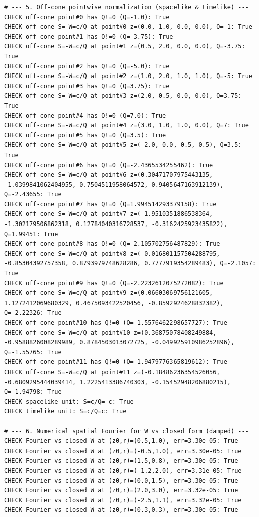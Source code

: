 \documentclass{article}
\theoremstyle{remark}
\begin{document}
\begin{lstlisting}
# --- 5. Off-cone pointwise normalization (spacelike & timelike) ---
CHECK off-cone point#0 has Q!=0 (Q=-1.0): True
CHECK off-cone S=-W=c/Q at point#0 z=(0.0, 1.0, 0.0, 0.0), Q=-1: True
CHECK off-cone point#1 has Q!=0 (Q=-3.75): True
CHECK off-cone S=-W=c/Q at point#1 z=(0.5, 2.0, 0.0, 0.0), Q=-3.75: True
CHECK off-cone point#2 has Q!=0 (Q=-5.0): True
CHECK off-cone S=-W=c/Q at point#2 z=(1.0, 2.0, 1.0, 1.0), Q=-5: True
CHECK off-cone point#3 has Q!=0 (Q=3.75): True
CHECK off-cone S=-W=c/Q at point#3 z=(2.0, 0.5, 0.0, 0.0), Q=3.75: True
CHECK off-cone point#4 has Q!=0 (Q=7.0): True
CHECK off-cone S=-W=c/Q at point#4 z=(3.0, 1.0, 1.0, 0.0), Q=7: True
CHECK off-cone point#5 has Q!=0 (Q=3.5): True
CHECK off-cone S=-W=c/Q at point#5 z=(-2.0, 0.0, 0.5, 0.5), Q=3.5: True
CHECK off-cone point#6 has Q!=0 (Q=-2.4365534255462): True
CHECK off-cone S=-W=c/Q at point#6 z=(0.30471707975443135, -1.0399841062404955, 0.7504511958064572, 0.9405647163912139), Q=-2.43655: True
CHECK off-cone point#7 has Q!=0 (Q=1.994514293379158): True
CHECK off-cone S=-W=c/Q at point#7 z=(-1.9510351886538364, -1.302179506862318, 0.12784040316728537, -0.3162425923435822), Q=1.99451: True
CHECK off-cone point#8 has Q!=0 (Q=-2.105702756487829): True
CHECK off-cone S=-W=c/Q at point#8 z=(-0.016801157504288795, -0.85304392757358, 0.8793979748628286, 0.7777919354289483), Q=-2.1057: True
CHECK off-cone point#9 has Q!=0 (Q=-2.2232612075272082): True
CHECK off-cone S=-W=c/Q at point#9 z=(0.06603069756121605, 1.1272412069680329, 0.4675093422520456, -0.8592924628832382), Q=-2.22326: True
CHECK off-cone point#10 has Q!=0 (Q=-1.5576462298657727): True
CHECK off-cone S=-W=c/Q at point#10 z=(0.36875078408249884, -0.9588826008289989, 0.8784503013072725, -0.049925910986252896), Q=-1.55765: True
CHECK off-cone point#11 has Q!=0 (Q=-1.9479776365819612): True
CHECK off-cone S=-W=c/Q at point#11 z=(-0.18486236354526056, -0.6809295444039414, 1.2225413386740303, -0.15452948206880215), Q=-1.94798: True
CHECK spacelike unit: S=c/Q=-c: True
CHECK timelike unit: S=c/Q=c: True

# --- 6. Numerical spatial Fourier for W vs closed form (damped) ---
CHECK Fourier vs closed W at (z0,r)=(0.5,1.0), err=3.30e-05: True
CHECK Fourier vs closed W at (z0,r)=(-0.5,1.0), err=3.30e-05: True
CHECK Fourier vs closed W at (z0,r)=(1.5,0.8), err=3.30e-05: True
CHECK Fourier vs closed W at (z0,r)=(-1.2,2.0), err=3.31e-05: True
CHECK Fourier vs closed W at (z0,r)=(0.0,1.5), err=3.30e-05: True
CHECK Fourier vs closed W at (z0,r)=(2.0,3.0), err=3.32e-05: True
CHECK Fourier vs closed W at (z0,r)=(-2.5,1.1), err=3.32e-05: True
CHECK Fourier vs closed W at (z0,r)=(0.3,0.3), err=3.30e-05: True


\end{lstlisting}
\end{document}
